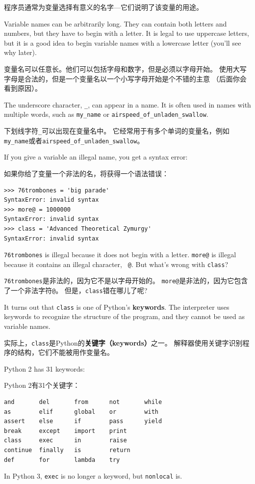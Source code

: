 \documentclass[10pt]{book}
\begin{document}
\begin{CJK}{UTF8}{gbsn}
程序员通常为变量选择有意义的名字---它们说明了该变量的用途。

Variable names can be arbitrarily long.  They can contain
both letters and numbers, but they have to begin with a letter.
It is legal to use uppercase letters, but it is a good idea
to begin variable names with a lowercase letter (you'll
see why later).

变量名可以任意长。他们可以包括字母和数字，但是必须以字母开始。
使用大写字母是合法的，但是一个变量名以一个小写字母开始是个不错的主意
（后面你会看到原因）。

The underscore character, \verb"_", can appear in a name.
It is often used in names with multiple words, such as
\verb"my_name" or \verb"airspeed_of_unladen_swallow".

下划线字符\verb"_"可以出现在变量名中。
它经常用于有多个单词的变量名，例如\verb"my_name"或者\verb"airspeed_of_unladen_swallow"。

If you give a variable an illegal name, you get a syntax error:

如果你给了变量一个非法的名，将获得一个语法错误：

\begin{verbatim}
>>> 76trombones = 'big parade'
SyntaxError: invalid syntax
>>> more@ = 1000000
SyntaxError: invalid syntax
>>> class = 'Advanced Theoretical Zymurgy'
SyntaxError: invalid syntax
\end{verbatim}
%
{\tt 76trombones} is illegal because it does not begin with a letter.
{\tt more@} is illegal because it contains an illegal character, {\tt
@}.  But what's wrong with {\tt class}?

{\tt 76trombones}是非法的，因为它不是以字母开始的。
{\tt more@}是非法的，因为它包含了一个非法字符{\tt @}。
但是，{\tt class}错在哪儿了呢?

It turns out that {\tt class} is one of Python's {\bf keywords}.  The
interpreter uses keywords to recognize the structure of the program,
and they cannot be used as variable names.

实际上，{\tt class}是Python的{\bf 关键字（keywords）}之一。
解释器使用关键字识别程序的结构，它们不能被用作变量名。

Python 2 has 31 keywords:

Python 2有31个关键字：

\begin{verbatim}
and       del       from      not       while    
as        elif      global    or        with     
assert    else      if        pass      yield    
break     except    import    print              
class     exec      in        raise              
continue  finally   is        return             
def       for       lambda    try
\end{verbatim}
%
In Python 3, {\tt exec} is no longer a keyword, but {\tt nonlocal} is.


\end{CJK}
\end{document}

